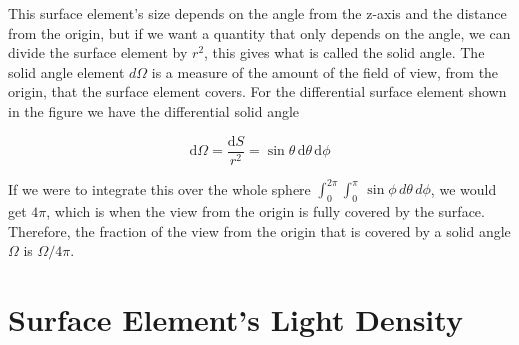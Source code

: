 This surface element's size depends on the angle from the z-axis and the distance from the origin, but if we want a quantity that only depends on the angle, we can divide the surface element by $r^2$, this gives what is called the solid angle.
The solid angle element $d\Omega$ is a measure of the amount of the field of view, from the origin, that the surface element covers. For the differential surface element shown in the figure we have the differential solid angle

\begin{equation}
	\label{eq: solid angle}
	\mathrm{d}\Omega = \frac{\mathrm{d}S}{r^2} = \sin\theta \,\mathrm{d}\theta \,\mathrm{d}\phi
\end{equation}

If we were to integrate this over the whole sphere $ \int_{0}^{2\pi} \int_{0}^{\pi} \, \sin \phi \, d\theta \, d\phi$, we would get $4\pi$, which is when the view from the origin is fully covered by the surface.
Therefore, the fraction of the view from the origin that is covered by a solid angle $\Omega$ is $\Omega/ 4\pi$.



\section{Surface Element's Light Density}\label{sect: Angular Density of Light from a Point Source}

